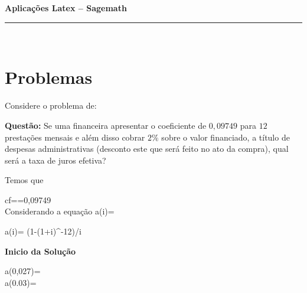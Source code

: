 \documentclass[11pt,a4paper]{article}
\newcommand{\nomer}{\bf Aplicações  Latex -- Sagemath}
\begin{document}
\Large
\large
\begin{center}
\noindent  \nomer
\end{center}
\hrule\ 
\section*{\sc Problemas}
Considere o problema de\cite{fina2007mathias}:
 


{\bf Questão: }Se uma financeira apresentar o coeficiente de $0,09749$ para $12$ prestações mensais e além disso cobrar $2\%$ sobre o valor financiado, a título de despesas administrativas (desconto este que será feito no ato da compra), qual será a taxa de juros efetiva?

{\sol Temos que}

\ben
cf==0,09749\\
\een
Considerando a equação
\ben
a(i)= 
\een
\begin{sagesilent}
a(i)= (1-(1+i)^-12)/i
\end{sagesilent}


{\bfseries Inicio da  Solução}

\ben
a(0,027)=\\
a(0.03)=\\
\een

\printbibliography
\end{document}
